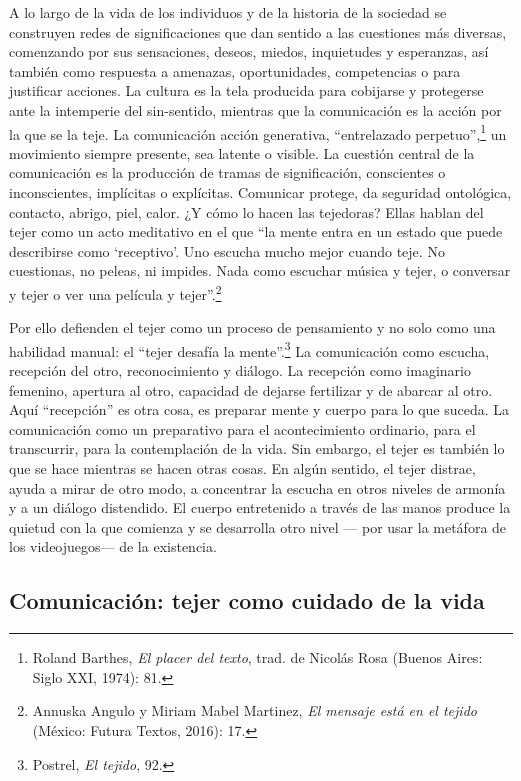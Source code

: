 \documentclass{tufte-handout}
\begin{document}
A lo largo de la vida de los individuos y de la historia de la sociedad
se construyen redes de significaciones que dan sentido a las cuestiones
más diversas, comenzando por sus sensaciones, deseos, miedos,
inquietudes y esperanzas, así también como respuesta a amenazas,
oportunidades, competencias o para justificar acciones. La cultura es la
tela producida para cobijarse y protegerse ante la intemperie del
sin-sentido, mientras que la comunicación es la acción por la que se la
teje. La comunicación acción generativa, ``entrelazado
perpetuo'',\footnote{Roland Barthes, \emph{El placer del texto}, trad.
  de Nicolás Rosa (Buenos Aires: Siglo XXI, 1974): 81.} un movimiento
siempre presente, sea latente o visible. La cuestión central de la
comunicación es la producción de tramas de significación, conscientes o
inconscientes, implícitas o explícitas. Comunicar protege, da seguridad
ontológica, contacto, abrigo, piel, calor. ¿Y cómo lo hacen las
tejedoras? Ellas hablan del tejer como un acto meditativo en el que ``la
mente entra en un estado que puede describirse como `receptivo'. Uno
escucha mucho mejor cuando teje. No cuestionas, no peleas, ni impides.
Nada como escuchar música y tejer, o conversar y tejer o ver una
película y tejer''.\footnote{Annuska Angulo y Miriam Mabel Martinez,
  \emph{El mensaje está en el tejido} (México: Futura Textos, 2016): 17.}

Por ello defienden el tejer como un proceso de pensamiento y no solo
como una habilidad manual: el ``tejer desafía la mente''.\footnote{Postrel,
  \emph{El tejido}, 92.} La comunicación como escucha, recepción del
otro, reconocimiento y diálogo. La recepción como imaginario femenino,
apertura al otro, capacidad de dejarse fertilizar y de abarcar al otro.
Aquí ``recepción'' es otra cosa, es preparar mente y cuerpo para lo que
suceda. La comunicación como un preparativo para el acontecimiento
ordinario, para el transcurrir, para la contemplación de la vida. Sin
embargo, el tejer es también lo que se hace mientras se hacen otras
cosas. En algún sentido, el tejer distrae, ayuda a mirar de otro modo, a
concentrar la escucha en otros niveles de armonía y a un diálogo
distendido. El cuerpo entretenido a través de las manos produce la
quietud con la que comienza y se desarrolla otro nivel --- por usar la
metáfora de los videojuegos--- de la existencia.

\hypertarget{comunicacin-tejer-como-cuidado-de-la-vida}{%
\subsection{Comunicación: tejer como cuidado de
la
vida}\label{comunicacin-tejer-como-cuidado-de-la-vida}}
\end{document}
